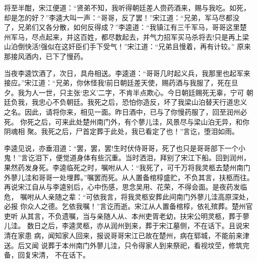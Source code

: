 将至半酣，宋江便道：“贤弟不知，我听得朝廷差人赍药酒来，赐与我吃。如死，
却是怎的好？”李逵大叫一声：“哥哥，反了罢！”宋江道：“兄弟，军马尽都没
了，兄弟们又各分散，如何反得成？”李逵道：“我镇江有三千军马，哥哥这里楚
州军马，尽点起来，并这百姓，都尽数起去，并气力招军买马杀将去!只是再上梁
山泊倒快活!强似在这奸臣们手下受气！”宋江道：“兄弟且慢着，再有计较。”
原来那接风酒内，已下了慢药。

当夜李逵饮酒了，次日，具舟相送。李逵道：“哥哥几时起义兵，我那里也起军来
接应。”宋江道：“兄弟，你休怪我!前日朝廷差天使，赐药酒与我服了，死在旦
夕。我为人一世，只主张‘忠义’二字，不肯半点欺心。今日朝廷赐死无辜，宁可
朝廷负我，我忠心不负朝廷。我死之后，恐怕你造反，坏了我梁山泊替天行道忠义
之名。因此，请将你来，相见一面。昨日酒中，已与了你慢药服了，回至润州必死。
你死之后，可来此处楚州南门外，有个蓼儿洼，风景尽与梁山泊无异，和你阴魂相
聚。我死之后，尸首定葬于此处，我已看定了也！”言讫，堕泪如雨。

李逵见说，亦垂泪道：“罢，罢，罢!生时伏侍哥哥，死了也只是哥哥部下一个小
鬼！”言讫泪下，便觉道身体有些沉重。当时洒泪，拜别了宋江下船。回到润州，
果然药发身死。李逵临死之时，嘱咐从人：“我死了，可千万将我灵柩去楚州南门
外蓼儿洼和哥哥一处埋葬。”嘱罢而死。从人置备棺椁盛贮，不负其言，扶柩而往。
再说宋江自从与李逵别后，心中伤感，思念吴用、花荣，不得会面。是夜药发临危，
嘱咐从人亲随之辈：“可依我言，将我灵柩安葬此间南门外蓼儿洼高原深处，必报
你众人之德。乞依我嘱！”言讫而逝。宋江从人置备棺椁，依礼殡葬。楚州官吏听
从其言，不负遗嘱，当与亲随人从、本州吏胥老幼，扶宋公明灵柩，葬于蓼儿洼。
数日之后，李逵灵柩，亦从润州到来，葬于宋江墓侧，不在话下。且说宋清在家患
病，闻知家人回来，报说哥哥宋江已故在楚州，病在郓城，不能前来津送。后又闻
说葬于本州南门外蓼儿洼，只令得家人到来祭祀，看视坟茔，修筑完备，回复宋清，
不在话下。

